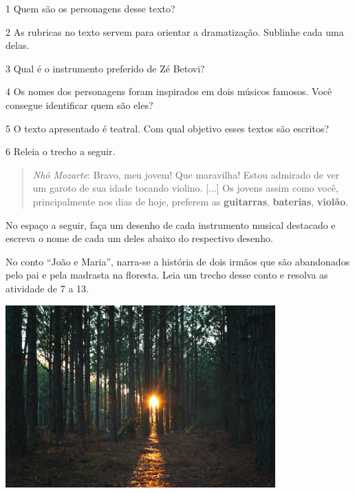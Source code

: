 \num{1} Quem são os personagens desse texto? 


\num{2} As rubricas no texto servem para orientar a dramatização. Sublinhe cada uma delas.

\num{3} Qual é o instrumento preferido de Zé Betovi? 


\num{4} Os nomes dos personagens foram inspirados em dois músicos famosos. Você
consegue identificar quem são eles? 


\num{5} O texto apresentado é teatral. Com qual objetivo esses textos são
escritos? 



\num{6} Releia o trecho a seguir.

\begin{quote}
\emph{Nhô Mozarte}: Bravo, meu jovem! Que maravilha! Estou admirado de
ver um garoto de sua idade tocando violino. {[}...{]} Os jovens assim
como você, principalmente nos dias de hoje, preferem as
\textbf{guitarras}, \textbf{baterias}, \textbf{violão}.
\end{quote}

No espaço a seguir, faça um desenho de cada instrumento musical
destacado e escreva o nome de cada um deles abaixo do respectivo desenho.

\begin{mdframed}[linewidth=2pt,linecolor=salmao,roundcorner=20pt]
\vspace{10cm}
\end{mdframed}

No conto ``João e Maria'', narra-se a história de dois irmãos que são
abandonados pelo pai e pela madrasta na floresta. Leia um trecho desse
conto e resolva as atividade de 7 a 13.


\includegraphics[width=4.08333in,height=2.76048in]{./media/image3.jpeg}

